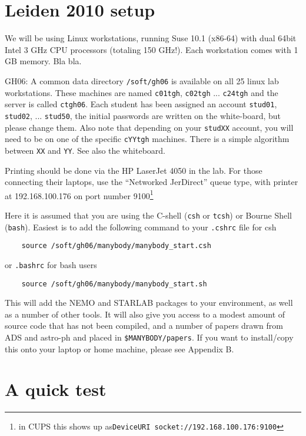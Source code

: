 {\section{Leiden 2010 setup}

We will be using Linux workstations, running Suse 10.1 (x86-64) with dual 64bit 
Intel 3 GHz CPU processors (totaling 150 GHz!). Each workstation comes with
1 GB memory.  Bla bla.

GH06: A common data directory {\tt /soft/gh06} is available on all 25
linux lab workstations. These machines are 
named {\tt c01tgh}, {\tt c02tgh} ... {\tt c24tgh} and the server
is called 
{\tt ctgh06}.   Each student has been assigned an account {\tt stud01}, 
{\tt stud02}, ... {\tt stud50}, the initial passwords are written
on the white-board, but please change them. Also note that depending
on your {\tt studXX} account, you will need to be on one of the
specific {\tt cYYtgh} machines. There is a simple algorithm between
{\tt XX} and {\tt YY}. See also the whiteboard.

Printing should be done via the HP LaserJet 4050 in the lab. For those connecting their
laptops, use the ``Networked JerDirect'' queue type, with printer at
192.168.100.176 on port number 
9100\footnote{in CUPS this shows up as{\tt DeviceURI socket://192.168.100.176:9100}}

Here it is assumed that you are using 
the C-shell ({\tt csh} or {\tt tcsh}) or Bourne Shell  ({\tt bash}).
Easiest is to add the following  command to your {\tt .cshrc} file
for csh

\begin{verbatim}
    source /soft/gh06/manybody/manybody_start.csh
\end{verbatim}
or {\tt .bashrc} for bash users
\begin{verbatim}
    source /soft/gh06/manybody/manybody_start.sh
\end{verbatim}

This will add the NEMO and STARLAB packages to your environment, as well as
a number of other tools. It will also give you access to
a modest amount of source code that has not been compiled, and a number
of papers drawn from ADS and astro-ph and placed in {\tt \$MANYBODY/papers}.
If you want to install/copy this onto your laptop or home machine, please
see Appendix B.

\section{A quick test}

}
